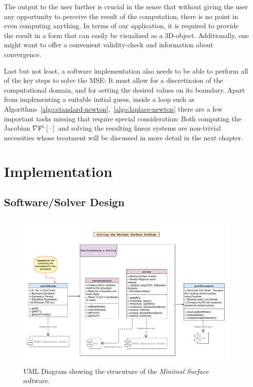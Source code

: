 \documentclass[11pt]{scrartcl}
\newcommand{\mSurfDisc}[1]{\ensuremath{\mathtt{F}^h\left[#1\right]}}
\begin{document}
The output to the user further is crucial in the sense that without giving the user any opportunity to perceive the result of the computation, there is no point in even computing anything. In terms of our application, it is required to provide the result in a form that can easily be visualized as a 3D-object. Additionally, one might want to offer a convenient validity-check and information about convergence.

Last but not least, a software implementation also needs to be able to perform all of the key steps to solve the MSE: It must allow for a discretizaion of the computational domain, and for setting the desired values on its boundary. Apart from implementing a suitable initial guess, inside a loop such as Algorithms~\ref{algo:standard-newton},~\ref{algo:laplace-newton} there are a few important tasks missing that require special consideration: Both computing the Jacobian $\nabla\mSurfDisc{\cdot}$ and solving the resulting linear systems are non-trivial necessities whose treatment will be discussed in more detail in the next chapter. 


\clearpage
\section{Implementation}
\subsection{Software/Solver Design}
\begin{figure}[H]
	\includegraphics[width=\textwidth]{./figs/ReportUML.pdf}
	\caption{UML Diagram showing the strucuture of the \textit{Minimal Surface} software.}
	\label{fig:UMLDiag}
\end{figure}
\end{document}
